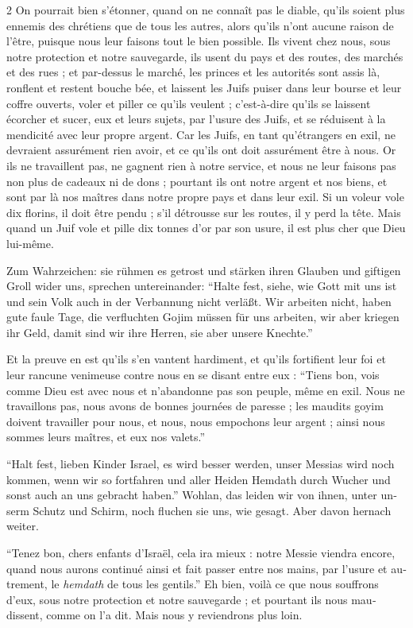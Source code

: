 \documentclass[a4paper,12pt]{article}
\newcommand\chunks[2]{%
\begin{leftcolumn*}\begin{otherlanguage}{german}%
{#1}%
\end{otherlanguage}\end{leftcolumn*}%
\begin{rightcolumn}\begin{otherlanguage}{french}%
{#2}%
\end{otherlanguage}\end{rightcolumn}%
}
\begin{document}
\begin{paracol}{2}
         {On pourrait bien s’étonner, quand on ne connaît pas le diable, qu’ils soient plus ennemis des chrétiens que de tous les autres, alors qu’ils n’ont aucune raison de l’être, puisque nous leur faisons tout le bien possible. Ils vivent chez nous, sous notre protection et notre sauvegarde, ils usent du pays et des routes, des marchés et des rues ; et par-dessus le marché, les princes et les autorités sont assis là, ronflent et restent bouche bée, et laissent les Juifs puiser dans leur bourse et leur coffre ouverts, voler et piller ce qu’ils veulent ; c’est-à-dire qu’ils se laissent écorcher et sucer, eux et leurs sujets, par l’usure des Juifs, et se réduisent à la mendicité avec leur propre argent. Car les Juifs, en tant qu’étrangers en exil, ne devraient assurément rien avoir, et ce qu’ils ont doit assurément être à nous. Or ils ne travaillent pas, ne gagnent rien à notre service, et nous ne leur faisons pas non plus de cadeaux ni de dons ; pourtant ils ont notre argent et nos biens, et sont par là nos maîtres dans notre propre pays et dans leur exil. Si un voleur vole dix florins, il doit être pendu ; s’il détrousse sur les routes, il y perd la tête. Mais quand un Juif vole et pille dix tonnes d’or par son usure, il est plus cher que Dieu lui-même.}
  \chunks{Zum Wahrzeichen: sie rühmen es getrost und stärken ihren Glauben und giftigen Groll wider uns, sprechen untereinander: \enquote{Halte fest, siehe, wie Gott mit uns ist und sein Volk auch in der Verbannung nicht verläßt. Wir arbeiten nicht, haben gute faule Tage, die verfluchten Gojim müssen für uns arbeiten, wir aber kriegen ihr Geld, damit sind wir ihre Herren, sie aber unsere Knechte.}}
         {Et la preuve en est qu’ils s’en vantent hardiment, et qu’ils fortifient leur foi et leur rancune venimeuse contre nous en se disant entre eux : \enquote{Tiens bon, vois comme Dieu est avec nous et n’abandonne pas son peuple, même en exil. Nous ne travaillons pas, nous avons de bonnes journées de paresse ; les maudits goyim doivent travailler pour nous, et nous, nous empochons leur argent ; ainsi nous sommes leurs maîtres, et eux nos valets.}}
  \chunks{\enquote{Halt fest, lieben Kinder Israel, es wird besser werden, unser Messias wird noch kommen, wenn wir so fortfahren und aller Heiden Hemdath durch Wucher und sonst auch an uns gebracht haben.} Wohlan, das leiden wir von ihnen, unter unserm Schutz und Schirm, noch fluchen sie uns, wie gesagt. Aber davon hernach weiter.}
         {\enquote{Tenez bon, chers enfants d’Israël, cela ira mieux : notre Messie viendra encore, quand nous aurons continué ainsi et fait passer entre nos mains, par l’usure et autrement, le \emph{hemdath} de tous les gentils.} Eh bien, voilà ce que nous souffrons d’eux, sous notre protection et notre sauvegarde ; et pourtant ils nous maudissent, comme on l’a dit. Mais nous y reviendrons plus loin.}

\end{paracol}
\end{document}
